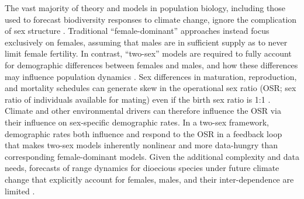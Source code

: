\documentclass[9pt,twocolumn,twoside,lineno]{pnas-new}
\begin{document}
The vast majority of theory and models in population biology, including those used to forecast biodiversity responses to climate change, ignore the complication of sex structure \citep[but see][] {pottier2021sexual,ellis2017does}.
Traditional ``female-dominant'' approaches instead focus exclusively on females, assuming that males are in sufficient supply as to never limit female fertility. 
In contrast, ``two-sex'' models are required to fully account for demographic differences between females and males, and how these differences may influence population dynamics \citep{gerber2014two,miller2011sex}. 
Sex differences in maturation, reproduction, and mortality schedules can generate skew in the operational sex ratio (OSR; sex ratio of individuals available for mating) even if the birth sex ratio is 1:1 \citep{eberhart2017sex,shelton2010ecological}. 
Climate and other environmental drivers can therefore influence the OSR via their influence on sex-specific demographic rates. 
In a two-sex framework, demographic rates both influence and respond to the OSR in a feedback loop that makes two-sex models inherently nonlinear and more data-hungry than corresponding female-dominant models. 
Given the additional complexity and data needs, forecasts of range dynamics for dioecious species under future climate change that explicitly account for females, males, and their inter-dependence are limited \citep{petry2016sex,lynch2014climate}.
\end{document}
